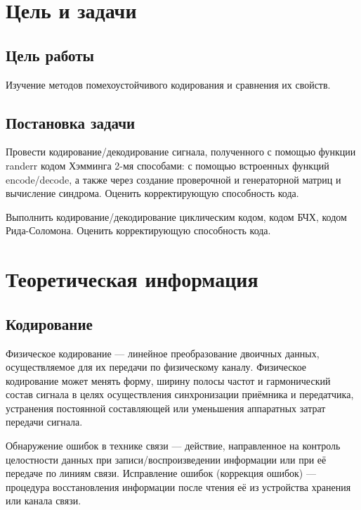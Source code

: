 

\setcounter{tocdepth}{3}






\section{Цель и задачи}

\subsection{Цель работы}
Изучение методов помехоустойчивого кодирования и сравнения их свойств.
 
\subsection{Постановка задачи}
Провести кодирование/декодирование сигнала, полученного с помощью функции randerr кодом Хэмминга 2-мя способами: с помощью встроенных функций encode/decode, а также через создание проверочной и генераторной матриц и вычисление синдрома. Оценить корректирующую способность кода.

Выполнить кодирование/декодирование циклическим кодом, кодом БЧХ, кодом Рида-Соломона. Оценить корректирующую способность кода.

 
\section{Теоретическая информация}

\subsection{Кодирование}
Физическое кодирование — линейное преобразование двоичных данных, осуществляемое для их передачи по физическому каналу. Физическое кодирование может менять форму, ширину полосы частот и гармонический состав сигнала в целях осуществления синхронизации приёмника и передатчика, устранения постоянной составляющей или уменьшения аппаратных затрат передачи сигнала.

Обнаружение ошибок в технике связи — действие, направленное на контроль целостности данных при записи/воспроизведении информации или при её передаче по линиям связи. Исправление ошибок (коррекция ошибок) — процедура восстановления информации после чтения её из устройства хранения или канала связи.

